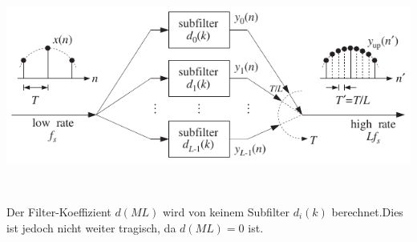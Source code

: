		\begin{minipage}{0.6\textwidth}
		  \includegraphics[width = \textwidth]{pic/polyphasefilter.pdf}
		 \end{minipage}
		 \begin{minipage}{0.01\textwidth}$ $\end{minipage}
		 \begin{minipage}{0.4\textwidth}
		  \begin{info}
		   Der Filter-Koeffizient $d(ML)$ wird von keinem Subfilter $d_i(k)$ berechnet.\newline Dies ist jedoch nicht weiter tragisch, da $d(ML) = 0$ ist.
		  \end{info}

		 \end{minipage} 
\newpage 		
